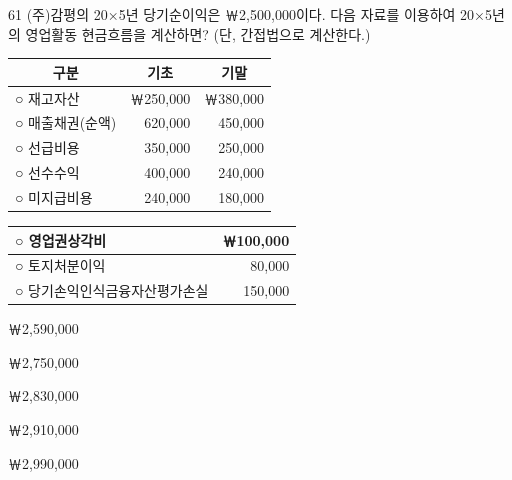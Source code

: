\begin{question}{61}
(주)감평의 20×5년 당기순이익은 ￦2,500,000이다. 다음 자료를 이용하여 20×5년의 영업활동 현금흐름을 계산하면? (단, 간접법으로 계산한다.)

{\small\centering\begin{tabular}{|l|r|r|}\hline
\multicolumn{1}{|c|}{구분} & \multicolumn{1}{c|}{기초} & \multicolumn{1}{c|}{기말} \\ \hline
○ 재고자산 & ￦250,000 & ￦380,000 \\ \hline
○ 매출채권(순액) & 620,000 & 450,000 \\ \hline
○ 선급비용 & 350,000 & 250,000 \\ \hline
○ 선수수익 & 400,000 & 240,000 \\ \hline
○ 미지급비용 & 240,000 & 180,000 \\ \hline
\end{tabular}\par}
\smallskip

{\small\centering\begin{tabular}{|l|r|}\hline
○ 영업권상각비 & ￦100,000 \\ \hline
○ 토지처분이익 & 80,000 \\ \hline
○ 당기손익인식금융자산평가손실 & 150,000 \\ \hline
\end{tabular}\par}
\begin{choices}
  \item ￦2,590,000
  \item ￦2,750,000
  \item ￦2,830,000
  \item ￦2,910,000
  \item ￦2,990,000
\end{choices}
\end{question}
